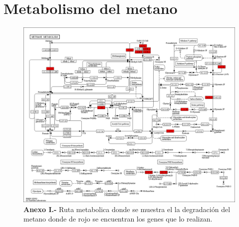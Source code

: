 \documentclass[12pt,letterpaper,oneside]{report}
\begin{document}
\chapter{Metabolismo del metano}
\begin{figure}[!h]
\centerline{\includegraphics[scale=0.42]{apendices/I-9}}
\caption*{\textbf{Anexo I.-} Ruta metabolica donde se muestra el la degradación del metano donde de rojo se encuentran los genes que lo realizan.}
\end{figure}
\end{document}
